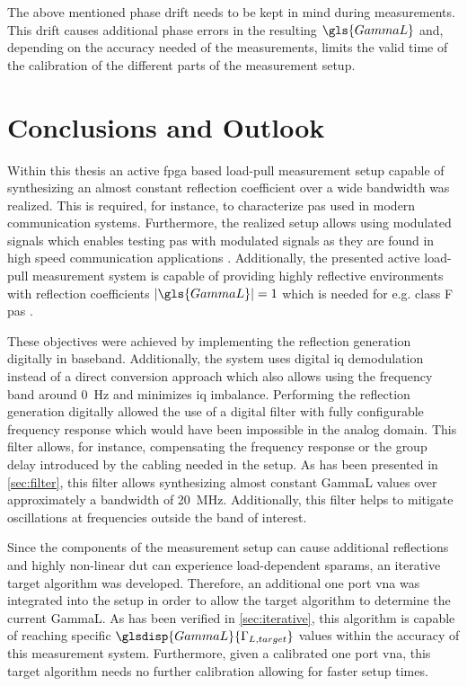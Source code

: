 \documentclass[12pt,a4paper,parskip=full,abstract=true,BCOR=12mm]{scrreprt}
\providecommand{\abs}[1]{\lvert#1\rvert}
\begin{document}
The above mentioned phase drift needs to be kept in mind during measurements. This
drift causes additional phase errors in the resulting $\gls{GammaL}$ and, depending on
the accuracy needed of the measurements, limits the valid time of the calibration of
the different parts of the measurement setup.


\chapter{Conclusions and Outlook}

Within this thesis an active \gls{fpga} based load-pull measurement setup capable of synthesizing
an almost constant reflection coefficient over a wide bandwidth was realized. This
is required, for instance, to characterize \glspl{pa} used in modern
communication systems. Furthermore, the realized setup allows using modulated signals which
enables testing \glspl{pa} with modulated signals as they are found in high speed
communication applications \cite{ghannouchi_load-pull_2013}. Additionally, the presented active load-pull measurement
system is capable of providing highly reflective environments with
reflection coefficients $\abs{\gls{GammaL}} = 1$ which is needed for
e.g. class F \glspl{pa} \cite{ghannouchi_load-pull_2013}.

These objectives were achieved by implementing the reflection generation digitally in
baseband. Additionally, the system uses digital \gls{iq} demodulation
instead of a direct conversion approach which also allows using the
frequency band around \SI{0}{\hertz} and minimizes \gls{iq} imbalance.
Performing the reflection generation digitally allowed the use of a
digital filter with fully configurable frequency response which would
have been impossible in the analog domain. This filter allows, for instance, compensating
the frequency response or the group delay introduced by the cabling needed in the setup. As has been
presented in \cref{sec:filter}, this filter allows synthesizing almost constant
\gls{GammaL} values over approximately a bandwidth of \SI{20}{\mega\hertz}. Additionally, this filter helps to mitigate
oscillations at frequencies outside the band of interest.

Since the components of the measurement setup can cause additional reflections
and highly non-linear \gls{dut} can experience load-dependent \glspl{sparam},
an iterative target algorithm was developed. Therefore, an additional one port \gls{vna}
was integrated into the setup in order to allow the target algorithm to determine
the current \gls{GammaL}. As has been verified in \cref{sec:iterative}, this
algorithm is capable of reaching specific $\glsdisp{GammaL}{\Gamma_{L,target}}$
values within the accuracy of this measurement system. Furthermore, given
a calibrated one port \gls{vna}, this target algorithm needs no further calibration
allowing for faster setup times.
\end{document}
